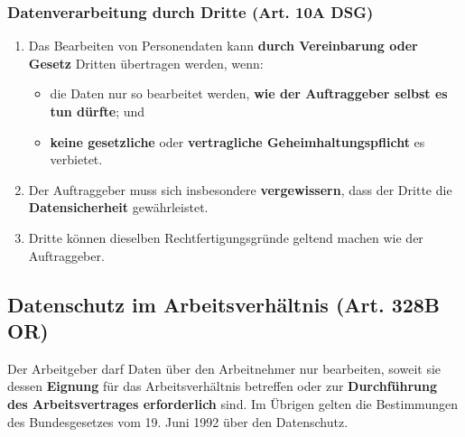 \subsubsection{Datenverarbeitung durch Dritte (Art. 10A DSG)}
\label{sec:Datenschutz-Dritte}

\begin{enumerate}
	\tightlist
	\item Das Bearbeiten von Personendaten kann \textbf{durch Vereinbarung oder
	Gesetz}	Dritten	übertragen werden, wenn:
	\begin{itemize}
		\tightlist
		\item die Daten nur so bearbeitet werden, \textbf{wie der Auftraggeber
		selbst es tun dürfte}; und
		\item \textbf{keine gesetzliche} oder \textbf{vertragliche
		Geheimhaltungspflicht} es verbietet.
	\end{itemize}
	\item Der Auftraggeber muss sich insbesondere \textbf{vergewissern}, dass
	der Dritte die \textbf{Datensicherheit} gewährleistet.
	\item Dritte können dieselben Rechtfertigungsgründe geltend machen wie der
	Auftraggeber.
\end{enumerate}

\subsection{Datenschutz im Arbeitsverhältnis (Art. 328B OR)}
\label{sec:Datenschutz-Arbetsverhältnis}
Der Arbeitgeber darf Daten über den Arbeitnehmer nur
bearbeiten, soweit sie dessen \textbf{Eignung} für das
Arbeitsverhältnis betreffen oder zur\textbf{ Durchführung des
Arbeitsvertrages erforderlich} sind. Im Übrigen gelten die
Bestimmungen des Bundesgesetzes vom 19. Juni 1992 über
den Datenschutz.
